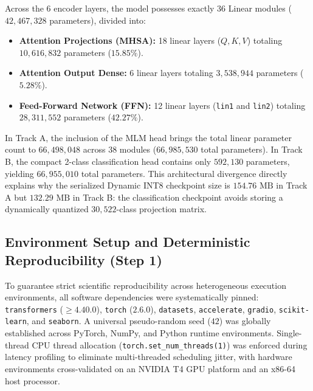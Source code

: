 \documentclass[conference]{IEEEtran}
\begin{document}
Across the 6 encoder layers, the model possesses exactly 36 Linear modules ($42,467,328$ parameters), divided into:
\begin{itemize}
    \item \textbf{Attention Projections (MHSA):} 18 linear layers ($Q, K, V$) totaling $10,616,832$ parameters ($15.85\%$).
    \item \textbf{Attention Output Dense:} 6 linear layers totaling $3,538,944$ parameters ($5.28\%$).
    \item \textbf{Feed-Forward Network (FFN):} 12 linear layers (\texttt{lin1} and \texttt{lin2}) totaling $28,311,552$ parameters ($42.27\%$).
\end{itemize}
In Track A, the inclusion of the MLM head brings the total linear parameter count to $66,498,048$ across 38 modules ($66,985,530$ total parameters). In Track B, the compact 2-class classification head contains only $592,130$ parameters, yielding $66,955,010$ total parameters. This architectural divergence directly explains why the serialized Dynamic INT8 checkpoint size is $154.76\text{ MB}$ in Track A but $132.29\text{ MB}$ in Track B: the classification checkpoint avoids storing a dynamically quantized $30,522$-class projection matrix.

\subsection{Environment Setup and Deterministic Reproducibility (Step 1)}
To guarantee strict scientific reproducibility across heterogeneous execution environments, all software dependencies were systematically pinned: \texttt{transformers} ($\ge 4.40.0$), \texttt{torch} ($2.6.0$), \texttt{datasets}, \texttt{accelerate}, \texttt{gradio}, \texttt{scikit-learn}, and \texttt{seaborn}. A universal pseudo-random seed ($42$) was globally established across PyTorch, NumPy, and Python runtime environments. Single-thread CPU thread allocation (\texttt{torch.set\_num\_threads(1)}) was enforced during latency profiling to eliminate multi-threaded scheduling jitter, with hardware environments cross-validated on an NVIDIA T4 GPU platform and an x86-64 host processor.
\end{document}
